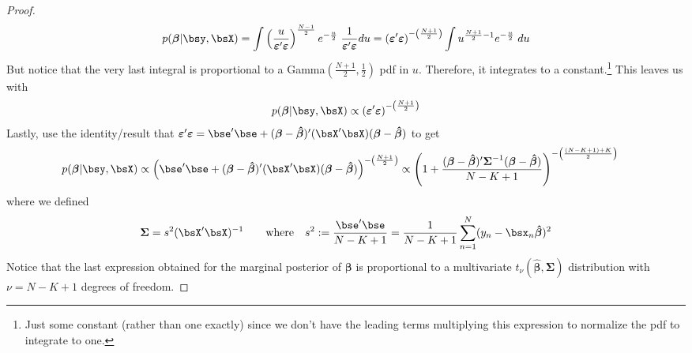 \documentclass[12pt]{article}
\theoremstyle{plain}
\theoremstyle{definition}
\theoremstyle{remark}
\newcommand{\bsSigma}{\boldsymbol{\Sigma}}
\newcommand{\bsvarepsilon}{\boldsymbol{\varepsilon}}
\newcommand{\bsbeta}{\boldsymbol{\beta}}
\newcommand{\bshatbeta}{\boldsymbol{\hat{\beta}}}
\newcommand{\sumnN}{\sum^N_{n=1}}
\begin{document}
\begin{proof}
\begin{align*}
  p(\bsbeta| \bsy,\bsX)
  =
  \int
  \left(
  \frac{u}{\bsvarepsilon'\bsvarepsilon}
  \right)^{\frac{N-1}{2}}
  e^{%
    -\frac{u}{2}
  }
  \;
  \frac{1}{\bsvarepsilon'\bsvarepsilon}
  du
  =
  \left(
  \bsvarepsilon'\bsvarepsilon
  \right)^{-\left(\frac{N+1}{2}\right)}
  \int
  u^{\frac{N+1}{2}-1}
  e^{-\frac{u}{2}}
  \;
  du
\end{align*}
But notice that the very last integral is proportional to a
Gamma$(\frac{N+1}{2},\frac{1}{2})$ pdf in $u$. Therefore, it integrates
to a constant.\footnote{%
  Just some constant (rather than one exactly) since we don't have the
  leading terms multiplying this expression to normalize the pdf to
  integrate to one.
}
This leaves us with
\begin{align*}
  p(\bsbeta| \bsy,\bsX)
  \propto
  \left(
  \bsvarepsilon'\bsvarepsilon
  \right)^{-\left(\frac{N+1}{2}\right)}
\end{align*}
Lastly, use the identity/result that $\bsvarepsilon'\bsvarepsilon =
\bse'\bse + (\bsbeta-\bshatbeta)'(\bsX'\bsX)(\bsbeta-\bshatbeta)$
to get
\begin{align*}
  p(\bsbeta| \bsy,\bsX)
  &\propto
  \left(
  \bse'\bse +
  (\bsbeta-\bshatbeta)'(\bsX'\bsX)(\bsbeta-\bshatbeta)
  \right)^{-\left(\frac{N+1}{2}\right)}
  \propto
  \left(
  1 +
  \frac{%
    (\bsbeta-\bshatbeta)'
    \bsSigma^{-1}
    (\bsbeta-\bshatbeta)
  }{N-K+1}
  \right)^{-\left(\frac{(N-K+1)+K}{2}\right)}
\end{align*}
where we defined
\begin{align*}
  \bsSigma
  = s^2(\bsX'\bsX)^{-1}
  \qquad
  \text{where}\quad
  s^2:=
  \frac{\bse'\bse}{N-K+1}
  =
  \frac{1}{N-K+1}\sumnN (y_n-\bsx_n\bshatbeta)^2
\end{align*}
Notice that the last expression obtained for the marginal posterior of
$\bsbeta$ is proportional to a multivariate $t_\nu(\bshatbeta,\bsSigma)$
distribution with $\nu=N-K+1$ degrees of freedom.
\end{proof}
\end{document}
